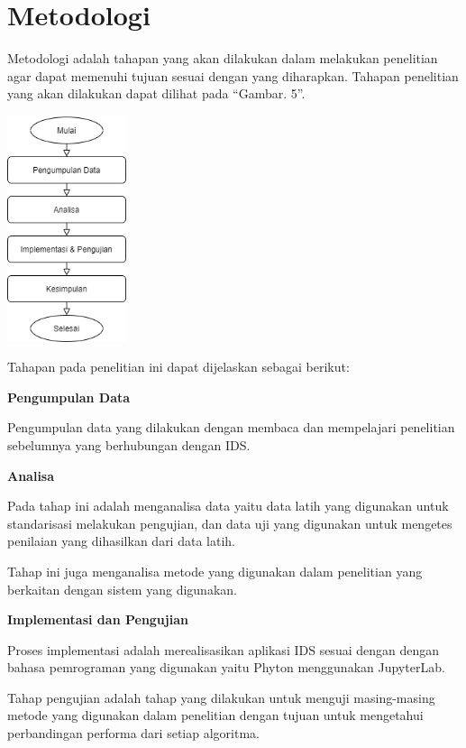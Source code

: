 \documentclass[conference]{IEEEtran}
\begin{document}
\section{Metodologi}

Metodologi adalah tahapan yang akan dilakukan dalam melakukan penelitian agar dapat memenuhi tujuan sesuai dengan yang diharapkan. Tahapan penelitian yang akan dilakukan dapat dilihat pada ``Gambar. 5''.

\begin{minipage}{\linewidth}
\centerline{\includegraphics[width=35mm]{Gambar/Metodologi_Diagram.png}}
\label{fig5}
\end{minipage}
\vspace{6pt}

Tahapan pada penelitian ini dapat dijelaskan sebagai berikut:

\noindent \textbf{Pengumpulan Data}

Pengumpulan data yang dilakukan dengan membaca dan mempelajari penelitian sebelumnya yang berhubungan dengan IDS.

\noindent \textbf{Analisa}

Pada tahap ini adalah menganalisa data yaitu data latih yang digunakan untuk standarisasi melakukan pengujian, dan data uji yang digunakan untuk mengetes penilaian yang dihasilkan
dari data latih.

Tahap ini juga menganalisa metode yang digunakan dalam penelitian yang berkaitan dengan sistem yang digunakan.

\noindent \textbf{Implementasi dan Pengujian}

Proses implementasi adalah merealisasikan aplikasi IDS sesuai dengan dengan bahasa pemrograman yang digunakan yaitu Phyton menggunakan JupyterLab.

Tahap pengujian adalah tahap yang dilakukan untuk menguji masing-masing metode yang digunakan dalam penelitian dengan tujuan untuk mengetahui perbandingan performa dari setiap algoritma.
\end{document}
